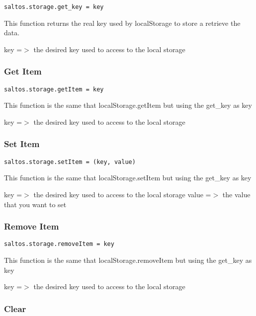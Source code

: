 \documentclass[a4paper]{article}
\begin{document}
\begin{lstlisting}
saltos.storage.get_key = key
\end{lstlisting}

This function returns the real key used by localStorage to store a retrieve
the data.

key =$>$ the desired key used to access to the local storage

\hypertarget{toc848}{}
\subsubsection{Get Item}

\begin{lstlisting}
saltos.storage.getItem = key
\end{lstlisting}

This function is the same that localStorage.getItem but using the get\_key as key

key =$>$ the desired key used to access to the local storage

\hypertarget{toc849}{}
\subsubsection{Set Item}

\begin{lstlisting}
saltos.storage.setItem = (key, value)
\end{lstlisting}

This function is the same that localStorage.setItem but using the get\_key as key

key   =$>$ the desired key used to access to the local storage
value =$>$ the value that you want to set

\hypertarget{toc850}{}
\subsubsection{Remove Item}

\begin{lstlisting}
saltos.storage.removeItem = key
\end{lstlisting}

This function is the same that localStorage.removeItem but using the get\_key as key

key =$>$ the desired key used to access to the local storage

\hypertarget{toc851}{}
\subsubsection{Clear}
\end{document}
